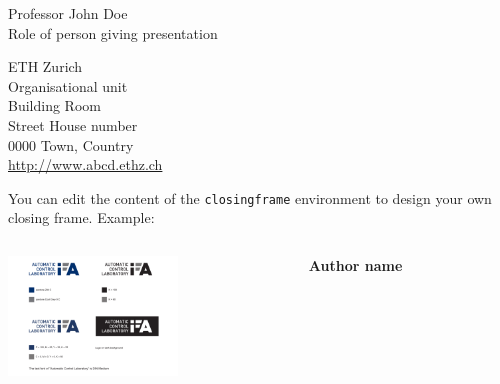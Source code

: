 \documentclass[11pt,aspectratio=169]{beamer}
\begin{document}
\begin{closingframe}

Professor John Doe\\
Role of person giving presentation\\

\medskip

ETH Zurich\\
Organisational unit\\
Building Room\\
Street House number\\
0000 Town, Country\\
\url{http://www.abcd.ethz.ch}

\end{closingframe}


\begin{closingframe}

	You can edit the content of the \texttt{closingframe} environment to design your own closing frame. Example:
	
	\vspace{15mm}

	\begin{columns}
		\begin{column}{0.55\textwidth}
			\raggedleft
			\includegraphics[width=45mm]{elements/IFA_logo_ENG_colours_horizontal} 
		\end{column}
		\begin{column}{0.45\textwidth}
			\textbf{Author name}\\
		\end{column}
	\end{columns}

	\vspace{20mm}
			
\end{closingframe}
\end{document}
